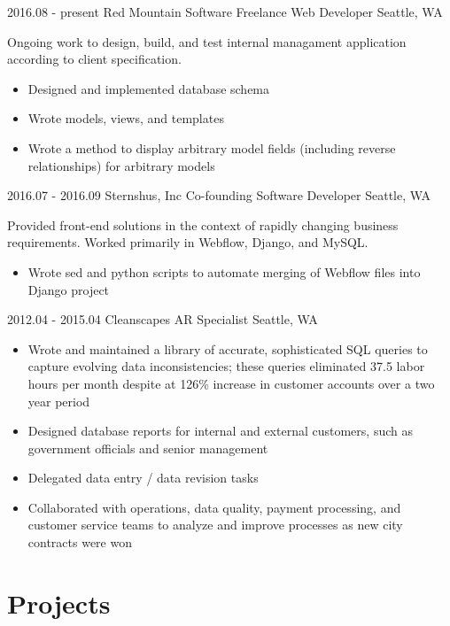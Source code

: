 \documentclass[10pt,a4paper,sans]{moderncv}        %
\begin{document}
\cventry
{2016.08 - present}
{Red Mountain Software}
{Freelance Web Developer}
{}
{Seattle, WA}
{Ongoing work to design, build, and test internal managament application
  according to client specification.
    \begin{itemize}
    \item Designed and implemented database schema
    \item Wrote models, views, and templates
    \item Wrote a method to display arbitrary model fields (including reverse
      relationships) for arbitrary models
    \end{itemize}}

\cventry
{2016.07 - 2016.09}
{Sternshus, Inc}
{Co-founding Software Developer}
{}
{Seattle, WA}
{Provided front-end solutions in the context of rapidly changing
  business requirements. Worked primarily in Webflow, Django, and MySQL.
    \begin{itemize}
    \item Wrote sed and python scripts to automate merging of Webflow files
      into Django project
    \end{itemize}}

\cventry
{2012.04 - 2015.04}
{Cleanscapes}
{AR Specialist}
{}
{Seattle, WA}
{
    \begin{itemize}
    \item Wrote and maintained a library of accurate, sophisticated SQL queries
      to capture evolving data inconsistencies; these queries eliminated 37.5
      labor hours per month despite at 126\% increase in customer accounts over
      a two year period
    \item Designed database reports for internal and external customers, such as
      government officials and senior management
    \item Delegated data entry / data revision tasks
      \item Collaborated with operations, data quality, payment processing, and
        customer service teams to analyze and improve processes as new city
        contracts were won
    \end{itemize}}

\section{Projects}

\begin{comment}
\cventry
{date}
{github url}
{name}
{}
{}
{description}
\end{comment}
\end{document}
